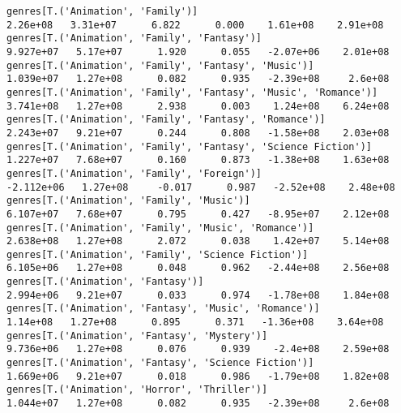 \documentclass[11pt]{article}
\begin{document}
\begin{Verbatim}[commandchars=\\\{\}]
genres[T.('Animation', 'Family')]                                                                              2.26e+08   3.31e+07      6.822      0.000    1.61e+08    2.91e+08
genres[T.('Animation', 'Family', 'Fantasy')]                                                                  9.927e+07   5.17e+07      1.920      0.055   -2.07e+06    2.01e+08
genres[T.('Animation', 'Family', 'Fantasy', 'Music')]                                                         1.039e+07   1.27e+08      0.082      0.935   -2.39e+08     2.6e+08
genres[T.('Animation', 'Family', 'Fantasy', 'Music', 'Romance')]                                              3.741e+08   1.27e+08      2.938      0.003    1.24e+08    6.24e+08
genres[T.('Animation', 'Family', 'Fantasy', 'Romance')]                                                       2.243e+07   9.21e+07      0.244      0.808   -1.58e+08    2.03e+08
genres[T.('Animation', 'Family', 'Fantasy', 'Science Fiction')]                                               1.227e+07   7.68e+07      0.160      0.873   -1.38e+08    1.63e+08
genres[T.('Animation', 'Family', 'Foreign')]                                                                 -2.112e+06   1.27e+08     -0.017      0.987   -2.52e+08    2.48e+08
genres[T.('Animation', 'Family', 'Music')]                                                                    6.107e+07   7.68e+07      0.795      0.427   -8.95e+07    2.12e+08
genres[T.('Animation', 'Family', 'Music', 'Romance')]                                                         2.638e+08   1.27e+08      2.072      0.038    1.42e+07    5.14e+08
genres[T.('Animation', 'Family', 'Science Fiction')]                                                          6.105e+06   1.27e+08      0.048      0.962   -2.44e+08    2.56e+08
genres[T.('Animation', 'Fantasy')]                                                                            2.994e+06   9.21e+07      0.033      0.974   -1.78e+08    1.84e+08
genres[T.('Animation', 'Fantasy', 'Music', 'Romance')]                                                         1.14e+08   1.27e+08      0.895      0.371   -1.36e+08    3.64e+08
genres[T.('Animation', 'Fantasy', 'Mystery')]                                                                 9.736e+06   1.27e+08      0.076      0.939    -2.4e+08    2.59e+08
genres[T.('Animation', 'Fantasy', 'Science Fiction')]                                                         1.669e+06   9.21e+07      0.018      0.986   -1.79e+08    1.82e+08
genres[T.('Animation', 'Horror', 'Thriller')]                                                                 1.044e+07   1.27e+08      0.082      0.935   -2.39e+08     2.6e+08

\end{Verbatim}
\end{document}
